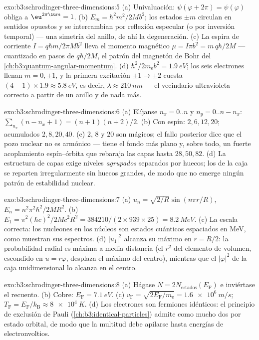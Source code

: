\begin{solution}{exo:b3:schrodinger-three-dimensions:5}
(a) Univaluación: $\psi(\varphi + 2\pi) = \psi(\varphi)$ obliga a
$\eu^{2\pi\iu m} = 1$. (b) $E_m = \hbar^2m^2/2Mb^2$; los estados $\pm
m$ circulan en sentidos opuestos y se intercambian por reflexión especular
(o por inversión temporal) --- una simetría del anillo, de ahí la
degeneración. (c) La espira de corriente $I = q\hbar m/2\pi Mb^2$ lleva el
momento magnético $\mu = I\pi b^2 = m\,q\hbar/2M$ --- cuantizado en pasos de
$q\hbar/2M$, el patrón del magnetón de Bohr del
\cref{ch:b3:quantum-angular-momentum}.
(d) $\hbar^2/2m_{\text{e}}b^2 = \qty{1.9}{eV}$; los seis electrones
llenan $m = 0, \pm1$, y la primera excitación $\pm1 \to \pm2$ cuesta
$(4-1) \times 1.9 \approx \qty{5.8}{eV}$, es decir, $\lambda \approx
\qty{210}{nm}$ --- el vecindario ultravioleta correcto a partir de un anillo
y de nada más.
\end{solution}

\begin{solution}{exo:b3:schrodinger-three-dimensions:6}
(a) Elíjanse $n_x = 0..n$ y $n_y = 0..n - n_x$: $\sum_{n_x}(n - n_x
+ 1) = (n+1)(n+2)/2$. (b) Con espín: $2, 6, 12, 20$; acumulados $2,
8, 20, 40$. (c) $2$, $8$ y $20$ son mágicos; el fallo posterior dice que
el pozo nuclear no es armónico --- tiene el fondo más plano y, sobre todo,
un fuerte acoplamiento espín--órbita que rebaraja las capas hasta
$28, 50, 82$. (d) La estructura de capas exige niveles \emph{agrupados}
separados por huecos; los de la caja se reparten irregularmente sin huecos
grandes, de modo que no emerge ningún patrón de estabilidad nuclear.
\end{solution}

\begin{solution}{exo:b3:schrodinger-three-dimensions:7}
(a) $u_n = \sqrt{2/R}\sin(n\pi r/R)$, $E_n = n^2\pi^2\hbar^2/2MR^2$.
(b) $E_1 = \pi^2(\hbar c)^2/2Mc^2R^2 = 384210/(2 \times 939 \times
25) = \qty{8.2}{MeV}$. (c) La escala correcta: los nucleones en los núcleos
son estados cuánticos espaciados en MeV, como muestran sus espectros. (d)
$|u_1|^2$ alcanza su máximo en $r = R/2$: la probabilidad radial es máxima a
media distancia (el $r^2$ del elemento de volumen, escondido en
$u = r\varphi$, desplaza el máximo del centro), mientras que el
$|\varphi|^2$ de la caja unidimensional lo alcanza en el centro.
\end{solution}

\begin{solution}{exo:b3:schrodinger-three-dimensions:8}
(a) Hágase $N = 2N_{\text{estados}}(E_{\text{F}})$ e inviértase el recuento.
(b) Cobre: $E_{\text{F}} = \qty{7.1}{eV}$. (c) $v_{\text{F}} =
\sqrt{2E_{\text{F}}/m_{\text{e}}} = \qty{1.6e6}{m/s}$;
$T_{\text{F}} = E_{\text{F}}/k_{\text{B}} \approx \qty{8e4}{K}$. (d)
Los electrones son fermiones idénticos: el principio de exclusión de Pauli
(\cref{ch:b3:identical-particles}) admite como mucho dos por estado
orbital, de modo que la multitud debe apilarse hasta energías de
electronvoltios.
\end{solution}

